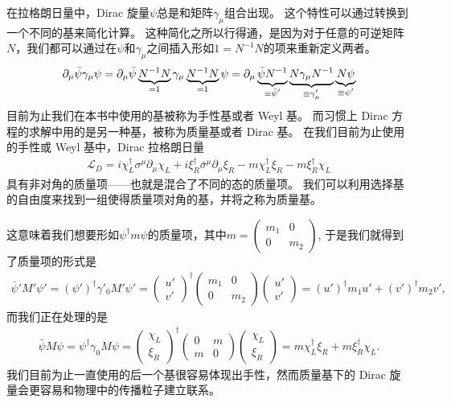 在拉格朗日量中，Dirac 旋量$\psi$总是和矩阵$\gamma_\mu$组合出现。
这个特性可以通过转换到一个不同的基来简化计算。
这种简化之所以行得通，是因为对于任意的可逆矩阵$N$，我们都可以通过在$\psi$和$\gamma_\mu$之间插入形如$1=N^{-1}N$的项来重新定义两者。
\begin{align}
  \partial_\mu\bar{\psi}\gamma_\mu\psi = \partial_\mu\bar{\psi}\underbrace{N^{-1}N}_{\mathclap{=1}}\gamma_\mu\underbrace{N^{-1}N}_{\mathclap{=1}}\psi = \partial_\mu\underbrace{\bar{\psi}N^{-1}}_{\mathclap{\equiv\bar{\psi}'}}\underbrace{N\gamma_\mu N^{-1}}_{\mathclap{\equiv\gamma'_\mu}}\underbrace{N\psi}_{\mathclap{\equiv\psi'}}
\end{align}
目前为止我们在本书中使用的基被称为手性基或者 Weyl 基。
而习惯上 Dirac 方程的求解中用的是另一种基，被称为质量基或者 Dirac 基。
在我们目前为止使用的手性或 Weyl 基中，Dirac 拉格朗日量
\begin{align}
  \mathcal{L}_D=i\chi_L^\dagger\sigma^\mu\partial_\mu \chi_L+i\xi_R^\dagger\bar{\sigma}^\mu\partial_\mu \xi_R-m\chi_L^\dagger\xi_R-m\xi_R^\dagger\chi_L
\end{align}
具有非对角的质量项——也就是混合了不同的态的质量项。
我们可以利用选择基的自由度来找到一组使得质量项对角的基，并将之称为质量基。

这意味着我们想要形如$\psi^\dagger m\psi$的质量项，其中$m=\begin{pmatrix}m_1&0\\0&m_2\end{pmatrix}$,
于是我们就得到了质量项的形式是
\begin{align}
  \bar{\psi}'M'\psi'=(\psi')^\dagger%
  \gamma'_0M'\psi'=\begin{pmatrix}u'\\v'\end{pmatrix}^\dagger\begin{pmatrix}m_1&0\\0&m_2\end{pmatrix}
  \begin{pmatrix}u'\\v'\end{pmatrix}=(u')^\dagger m_1u'+(v')^\dagger m_2v',
\end{align}
而我们正在处理的是
\begin{align}
  \bar{\psi}M\psi=\psi^\dagger\gamma_0M\psi=\begin{pmatrix}\chi_L\\\xi_R\end{pmatrix}^\dagger\begin{pmatrix}0&m\\m&0\end{pmatrix}
  \begin{pmatrix}\chi_L\\\xi_R\end{pmatrix}=m\chi_L^\dagger\xi_R+m\xi_R^\dagger\chi_L.
\end{align}
我们目前为止一直使用的后一个基很容易体现出手性，然而质量基下的 Dirac 旋量会更容易和物理中的传播粒子建立联系。

